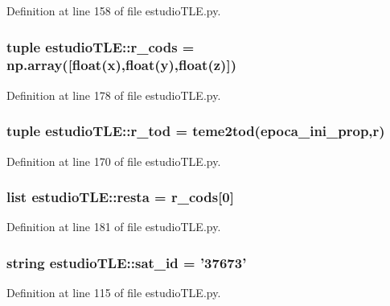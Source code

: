\-Definition at line 158 of file estudio\-T\-L\-E.\-py.

\subsubsection[{r\-\_\-cods}]{\setlength{\rightskip}{0pt plus 5cm}tuple {\bf estudio\-T\-L\-E\-::r\-\_\-cods} = np.\-array([float({\bf x}),float({\bf y}),float({\bf z})])}\label{namespaceestudio_t_l_e_a1b00721df9da8b35d54765e9f5ffca44}


\-Definition at line 178 of file estudio\-T\-L\-E.\-py.

\subsubsection[{r\-\_\-tod}]{\setlength{\rightskip}{0pt plus 5cm}tuple {\bf estudio\-T\-L\-E\-::r\-\_\-tod} = teme2tod({\bf epoca\-\_\-ini\-\_\-prop},r)}\label{namespaceestudio_t_l_e_a299627ac470b042bc4d26d25aef1a790}


\-Definition at line 170 of file estudio\-T\-L\-E.\-py.

\subsubsection[{resta}]{\setlength{\rightskip}{0pt plus 5cm}list {\bf estudio\-T\-L\-E\-::resta} = {\bf r\-\_\-cods}[0]}\label{namespaceestudio_t_l_e_ac49c596bc8811ca7fe0415bc0034894a}


\-Definition at line 181 of file estudio\-T\-L\-E.\-py.

\subsubsection[{sat\-\_\-id}]{\setlength{\rightskip}{0pt plus 5cm}string {\bf estudio\-T\-L\-E\-::sat\-\_\-id} = '37673'}\label{namespaceestudio_t_l_e_a85ca1771abea931dec7b455964ba32a1}


\-Definition at line 115 of file estudio\-T\-L\-E.\-py.

